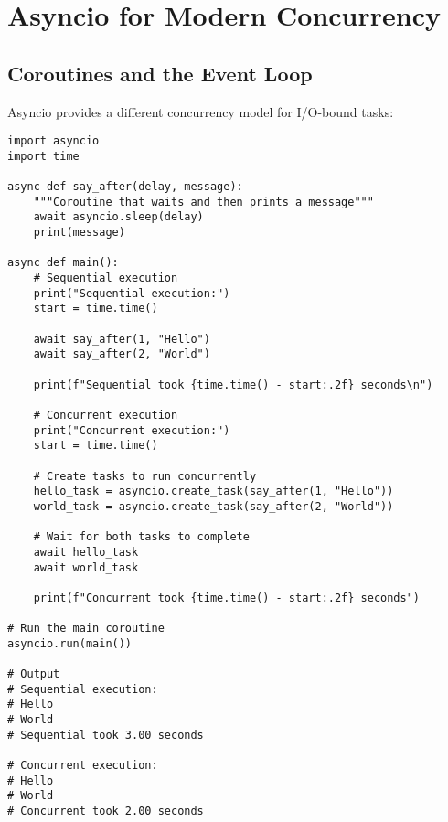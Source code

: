 \documentclass[12pt,letterpaper]{article}
\newenvironment{macterminal}{%
    \begin{mdframed}[
        linecolor=terminalFrame,
        backgroundcolor=terminalBg,
        roundcorner=5pt,
        skipabove=10pt,
        skipbelow=10pt,
        linewidth=1pt,
        innertopmargin=10pt, %
        frametitle={%
            \tikz[baseline=(current bounding box.east), outer sep=0pt]{
                \fill[red!80!black] (0,0) circle (5pt);
                \fill[yellow!80!black] (0.7,0) circle (5pt);
                \fill[green!70!black] (1.4,0) circle (5pt);
            }
        },
        frametitlealignment=\raggedright, %
        frametitleaboveskip=8pt, %
        frametitlebelowskip=0pt, %
    ]
}{%
    \end{mdframed}%
}
\begin{document}
\setlength{\parindent}{0pt}
\color{primaryColor} %

\begin{titlepage}
    \titlepagecontents
\end{titlepage}

\section{Asyncio for Modern Concurrency}

\subsection{Coroutines and the Event Loop}

Asyncio provides a different concurrency model for I/O-bound tasks:

\begin{macterminal}
\begin{lstlisting}
import asyncio
import time

async def say_after(delay, message):
    """Coroutine that waits and then prints a message"""
    await asyncio.sleep(delay)
    print(message)

async def main():
    # Sequential execution
    print("Sequential execution:")
    start = time.time()
    
    await say_after(1, "Hello")
    await say_after(2, "World")
    
    print(f"Sequential took {time.time() - start:.2f} seconds\n")
    
    # Concurrent execution
    print("Concurrent execution:")
    start = time.time()
    
    # Create tasks to run concurrently
    hello_task = asyncio.create_task(say_after(1, "Hello"))
    world_task = asyncio.create_task(say_after(2, "World"))
    
    # Wait for both tasks to complete
    await hello_task
    await world_task
    
    print(f"Concurrent took {time.time() - start:.2f} seconds")

# Run the main coroutine
asyncio.run(main())

# Output
# Sequential execution:
# Hello
# World
# Sequential took 3.00 seconds

# Concurrent execution:
# Hello
# World
# Concurrent took 2.00 seconds
\end{lstlisting}
\end{macterminal}
\end{document}
